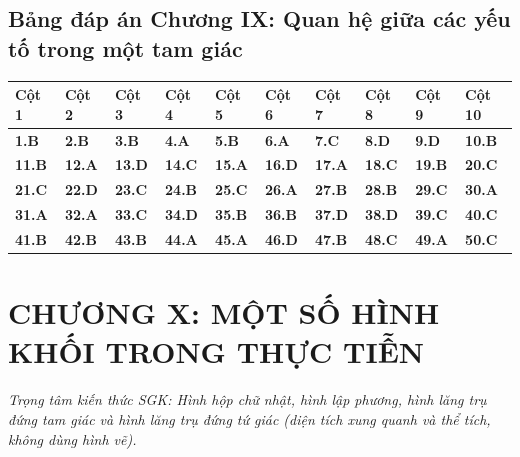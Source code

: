 \documentclass[11pt,a4paper]{article}
\begin{document}
\subsection*{\color{primary} Bảng đáp án Chương IX: Quan hệ giữa các yếu tố trong một tam giác}
\begin{center}
\renewcommand{\arraystretch}{1.25}
\begin{tabularx}{\textwidth}{*{10}{>{\centering\arraybackslash}X}}
\toprule
\textbf{\color{primary} Cột 1} & \textbf{\color{primary} Cột 2} & \textbf{\color{primary} Cột 3} & \textbf{\color{primary} Cột 4} & \textbf{\color{primary} Cột 5} & \textbf{\color{primary} Cột 6} & \textbf{\color{primary} Cột 7} & \textbf{\color{primary} Cột 8} & \textbf{\color{primary} Cột 9} & \textbf{\color{primary} Cột 10} \\
\midrule
\textbf{1.B} & \textbf{2.B} & \textbf{3.B} & \textbf{4.A} & \textbf{5.B} & \textbf{6.A} & \textbf{7.C} & \textbf{8.D} & \textbf{9.D} & \textbf{10.B} \\
\rowcolor{rowtint} \textbf{11.B} & \textbf{12.A} & \textbf{13.D} & \textbf{14.C} & \textbf{15.A} & \textbf{16.D} & \textbf{17.A} & \textbf{18.C} & \textbf{19.B} & \textbf{20.C} \\
\textbf{21.C} & \textbf{22.D} & \textbf{23.C} & \textbf{24.B} & \textbf{25.C} & \textbf{26.A} & \textbf{27.B} & \textbf{28.B} & \textbf{29.C} & \textbf{30.A} \\
\rowcolor{rowtint} \textbf{31.A} & \textbf{32.A} & \textbf{33.C} & \textbf{34.D} & \textbf{35.B} & \textbf{36.B} & \textbf{37.D} & \textbf{38.D} & \textbf{39.C} & \textbf{40.C} \\
\textbf{41.B} & \textbf{42.B} & \textbf{43.B} & \textbf{44.A} & \textbf{45.A} & \textbf{46.D} & \textbf{47.B} & \textbf{48.C} & \textbf{49.A} & \textbf{50.C} \\
\bottomrule
\end{tabularx}
\end{center}\vspace{10pt}
\section*{\color{primary} CHƯƠNG X: MỘT SỐ HÌNH KHỐI TRONG THỰC TIỄN}
\textit{Trọng tâm kiến thức SGK: Hình hộp chữ nhật, hình lập phương, hình lăng trụ đứng tam giác và hình lăng trụ đứng tứ giác (diện tích xung quanh và thể tích, không dùng hình vẽ).}\par\vspace{4pt}
\end{document}
